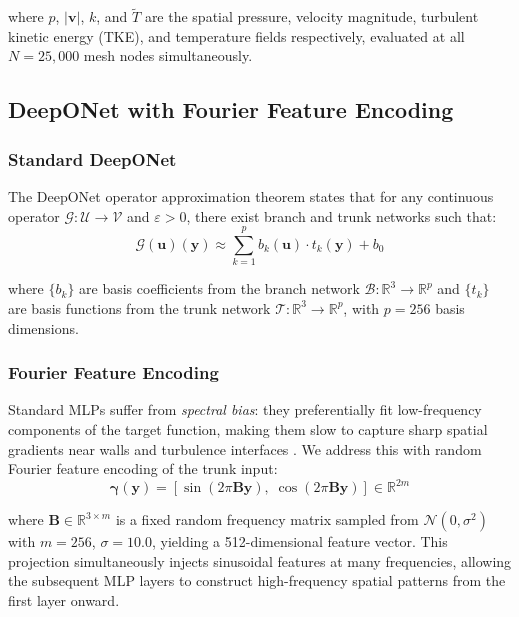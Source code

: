\documentclass[conference]{IEEEtran}
\begin{document}
where $p$, $|\mathbf{v}|$, $k$, and $\tilde{T}$ are the spatial pressure, velocity magnitude, turbulent kinetic energy (TKE), and temperature fields respectively, evaluated at all $N = 25{,}000$ mesh nodes simultaneously.

\subsection{DeepONet with Fourier Feature Encoding}

\subsubsection{Standard DeepONet}
The DeepONet operator approximation theorem \cite{lu2021deeponet, chen1995} states that for any continuous operator $\mathcal{G}: \mathcal{U} \to \mathcal{V}$ and $\varepsilon > 0$, there exist branch and trunk networks such that:
\begin{equation}
\mathcal{G}(\mathbf{u})(\mathbf{y}) \approx \sum_{k=1}^{p} b_k(\mathbf{u}) \cdot t_k(\mathbf{y}) + b_0
\label{eq:deeponet}
\end{equation}

where $\{b_k\}$ are basis coefficients from the branch network $\mathcal{B}: \mathbb{R}^3 \to \mathbb{R}^p$ and $\{t_k\}$ are basis functions from the trunk network $\mathcal{T}: \mathbb{R}^3 \to \mathbb{R}^p$, with $p = 256$ basis dimensions.

\subsubsection{Fourier Feature Encoding}
Standard MLPs suffer from \emph{spectral bias}: they preferentially fit low-frequency components of the target function, making them slow to capture sharp spatial gradients near walls and turbulence interfaces \cite{rahaman2019spectral, tancik2020ffn}. We address this with random Fourier feature encoding of the trunk input:
\begin{equation}
\boldsymbol{\gamma}(\mathbf{y}) = \left[\sin(2\pi \mathbf{B}\mathbf{y}),\;\cos(2\pi \mathbf{B}\mathbf{y})\right] \in \mathbb{R}^{2m}
\label{eq:fourier}
\end{equation}

where $\mathbf{B} \in \mathbb{R}^{3 \times m}$ is a fixed random frequency matrix sampled from $\mathcal{N}(0, \sigma^2)$ with $m = 256$, $\sigma = 10.0$, yielding a 512-dimensional feature vector. This projection simultaneously injects sinusoidal features at many frequencies, allowing the subsequent MLP layers to construct high-frequency spatial patterns from the first layer onward.
\end{document}
